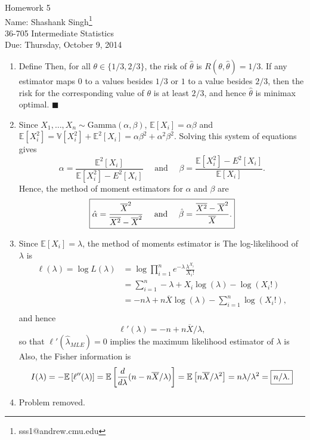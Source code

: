 \documentclass[11pt]{article}
\makeatletter
\newcommand{\myname}{Shashank Singh\footnote{sss1@andrew.cmu.edu}}
\newcommand{\myclass}{36-705 Intermediate Statistics}
\newcommand{\myhwnum}{5}
\newcommand{\duedate}{Thursday, October 9, 2014}
\renewcommand{\qed}{\quad \ensuremath{\blacksquare}}
\newcommand{\E}{\mathbb{E}} %
\newcommand{\Var}{\mathbb{V}} %
\newcommand{\ol}{\overline}
\makeatother
\begin{document}
\thispagestyle{plain}

{\Large Homework \myhwnum} \\
Name: \myname \\
\myclass \\
Due: \duedate

\begin{enumerate}
\item Define  Then, for all
$\theta \in \{1/3,2/3\}$, the risk of $\hat\theta$ is
$R(\theta,\hat\theta) = 1/3$. If any estimator maps $0$ to a values besides
$1/3$ or $1$ to a value besides $2/3$, then the risk for the corresponding
value of $\theta$ is at least $2/3$, and hence $\hat\theta$ is minimax optimal.
\qed

\item Since $X_1,\dots,X_n \sim $Gamma$(\alpha,\beta)$,
$\E[X_i] = \alpha\beta$ and
$\E[X_i^2] = \Var[X_i^2] + \E^2[X_i] = \alpha\beta^2 + \alpha^2\beta^2$.
Solving this system of equations gives
\[\alpha = \frac{\E^2[X_i]}{\E[X_i^2] - E^2[X_i]}
    \quad \mbox{ and } \quad
    \beta = \frac{\E[X_i^2] - E^2[X_i]}{\E[X_i]}.
\]
Hence, the method of moment estimators for $\alpha$ and $\beta$ are
\[\mbox{\fbox{$\displaystyle
    \hat\alpha = \frac{\ol X^2}{\ol{X^2} - \ol X^2}
    \quad \mbox{ and } \quad
    \hat\beta = \frac{\ol{X^2} - \ol X^2}{\ol X}$.}}
\]

\item Since $\E[X_i] = \lambda$, the method of moments estimator is
\fbox{$\hat \lambda_{MOM} = \ol X$.} The log-likelihood of $\lambda$ is
\begin{align*}
\ell(\lambda)
    = \log L(\lambda)
 &  = \log \prod_{i = 1}^n e^{-\lambda} \frac{\lambda^{X_i}}{X_i!}      \\
 &  = \sum_{i = 1}^n -\lambda + X_i \log(\lambda) - \log(X_i!)          \\
 &  = -n\lambda + n \ol X \log(\lambda) - \sum_{i = 1}^n \log(X_i!),    \\
\end{align*}
and hence
\[\ell'(\lambda)
    = -n + n \ol X/\lambda,
\]
so that $\ell'(\hat\lambda_{MLE}) = 0$ implies the maximum likelihood estimator
of $\lambda$ is \fbox{$\hat \lambda_{MLE} = \ol X$.} Also, the Fisher
information is
\[I(\lambda)
    = -\E\left[ \ell''(\lambda) \right]
    = \E\left[ \frac{d}{d\lambda} (n - n \ol X/\lambda) \right]
    = \E\left[ n \ol X/\lambda^2 \right]
    = n \lambda/\lambda^2
    = \mbox{\fbox{$n/\lambda$.}}
\] 


\item Problem removed.


\end{enumerate}
\end{document}
